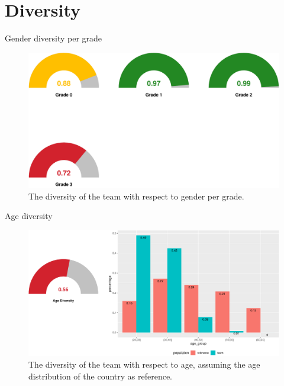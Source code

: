 \documentclass[
  ignorenonframetext,
  usenames,
  dvipsnames]{beamer}
\begin{document}
\hypertarget{diversity}{%
\section{Diversity}\label{diversity}}

\begin{frame}{Gender diversity per grade}
\protect\hypertarget{gender-diversity-per-grade}{}
\begin{figure}
\centering
\includegraphics{team_slides_files/figure-beamer/unnamed-chunk-1-1.pdf}
\caption{The diversity of the team with respect to gender per
grade.\label{fig:gender-gauge}}
\end{figure}
\end{frame}

\begin{frame}{Age diversity}
\protect\hypertarget{age-diversity}{}
\begin{figure}
\centering
\includegraphics{team_slides_files/figure-beamer/ageism-1.pdf}
\caption{The diversity of the team with respect to age, assuming the age
distribution of the country as reference.\label{fig:ageism}}
\end{figure}
\end{frame}
\end{document}
